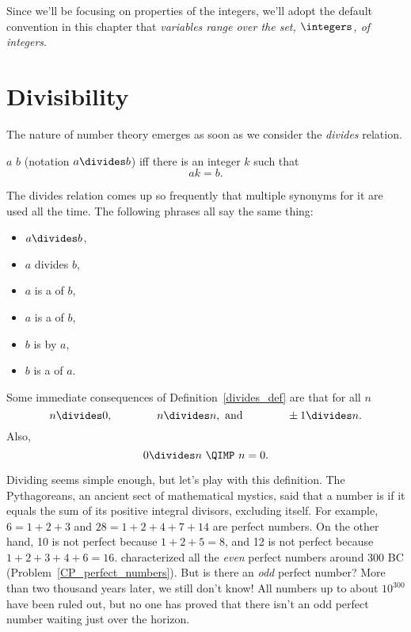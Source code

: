 
Since we'll be focusing on properties of the integers, we'll adopt the
default convention in this chapter that \emph{variables range over
  the set, $\integers$, of integers}.

\section{Divisibility}\label{divisibility_sec}

The nature of number theory emerges as soon as we consider the \emph{divides} relation.
\begin{definition}\label{divides_def}
$a$  $b$ (notation $a \divides b$) iff there is an integer $k$ such that
\[
ak = b.
\]
\end{definition}
The divides relation comes up so frequently that multiple synonyms for it are used all the
time.  The following phrases all say the same thing:
\begin{itemize}
\item $a \divides b$,
\item $a$ divides $b$,
\item $a$ is a  of $b$,
\item $a$ is a  of $b$,
\item $b$ is  by $a$,
\item $b$ is a  of $a$.
\end{itemize}
Some immediate consequences of Definition~\ref{divides_def} are that for
all $n$
\[
n  \divides 0,\qquad\qquad
n  \divides n, \text{ and}\qquad\qquad
\pm1  \divides n.
\]
Also,
\[
0 \divides n\ \QIMP\ n = 0.
\]

Dividing seems simple enough, but let's play with this definition.  The Pythagoreans, an
ancient sect of mathematical mystics, said that a number is  if it equals the sum of its positive integral divisors, excluding
itself.  For example, $6 = 1 + 2 + 3$ and $28 = 1 + 2 + 4 + 7 + 14$ are perfect numbers.
On the other hand, 10 is not perfect because $1 + 2 + 5 = 8$, and 12 is not perfect because
$1 + 2 + 3 + 4 + 6 = 16$.   characterized all the \emph{even} perfect numbers
around 300 BC (Problem~\ref{CP_perfect_numbers}).  But is there an \emph{odd} perfect
number?  More than two thousand years later, we still don't know!  All numbers up to about
$10^{300}$ have been ruled out, but no one has proved that there isn't an odd perfect
number waiting just over the horizon.

